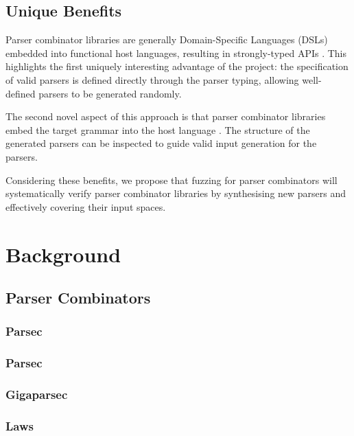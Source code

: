\documentclass{article}
\begin{document}
\subsection{Unique Benefits}
Parser combinator libraries are generally Domain-Specific Languages (DSLs) embedded into functional host languages, resulting in strongly-typed APIs \cite{monadic-combinators, parsec}. This highlights the first uniquely interesting advantage of the project: the specification of valid parsers is defined directly through the parser typing, allowing well-defined parsers to be generated randomly.

The second novel aspect of this approach is that parser combinator libraries embed the target grammar into the host language \cite{combinator-parsing}. The structure of the generated parsers can be inspected to guide valid input generation for the parsers.

Considering these benefits, we propose that fuzzing for parser combinators will systematically verify parser combinator libraries by synthesising new parsers and effectively covering their input spaces.

\section{Background} %

\subsection{Parser Combinators}
\subsubsection{Parsec}
\subsubsection{Parsec}
\subsubsection{Gigaparsec}
\subsubsection{Laws}
\end{document}
